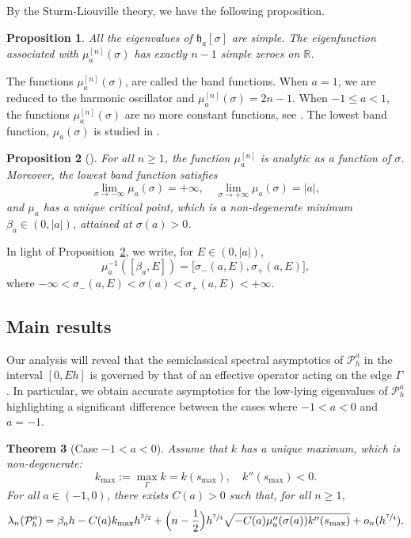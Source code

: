 \documentclass[10pt]{amsart}
\newcommand{\cP}{\mathcal{P}}
\theoremstyle{plain}
\newtheorem{theorem}{Theorem}[section]
\newtheorem{proposition}[theorem]{Proposition}
\theoremstyle{definition}
\newcommand{\R}{\mathbb{R}}
\begin{document}
By the Sturm-Liouville theory, we have the following proposition.

\begin{proposition}\label{lem.simple}
All the eigenvalues of $\mathfrak h_a[\sigma]$ are simple. 
The eigenfunction associated with $\mu^{[n]}_{a}(\sigma)$ has exactly $n-1$ simple zeroes on $\R$.
\end{proposition}

The functions $\mu^{[n]}_{a}(\sigma)$, are called the band functions. When $a=1$, we are reduced to the harmonic oscillator and $\mu^{[n]}_a(\sigma)=2n-1$. When $-1\leq a<1$, the functions $\mu^{[n]}_a(\sigma)$ are no more constant functions, see \cite{HPRS16}. The lowest band function, $\mu_{a}(\sigma)$ is studied in \cite{AK20}.

\begin{proposition}[\cite{AK20, HPRS16}]\label{prop.mu-a}
For all $n\geq 1$, the function $\mu^{[n]}_{a}$ is analytic as a function of $\sigma$. Moreover, the lowest band function satisfies
\begin{equation}\label{eq:limit-mu-a}
\lim\limits_{\sigma\to-\infty}\mu_a(\sigma)=+\infty,\quad \lim\limits_{\sigma\to+\infty}\mu_a(\sigma)=|a|,
\end{equation}
and $\mu_a$ has a unique critical point, which is a non-degenerate minimum $\beta_a\in(0,|a|)$, attained at $\sigma(a)>0$.
\end{proposition}
In light of Proposition~\ref{prop.mu-a}, we write, for $E\in(0,|a|)$,
\begin{equation}\label{eq:xi-pm}
\mu^{-1}_a([\beta_a,E])=\bigl[\sigma_-(a,E),\sigma_+(a,E)\bigr],
\end{equation}
where $-\infty<\sigma_-(a,E)<\sigma(a)<\sigma_+(a,E)<+\infty$.

\subsection{Main results}
Our analysis will reveal that the semiclassical spectral asymptotics of $\cP^a_h$ in the interval $[0,Eh]$ is governed by that of an effective operator acting on the edge $\Gamma$. In particular, we obtain accurate asymptotics for the low-lying eigenvalues of $\cP^a_h$ highlighting a significant difference between the cases where $-1<a<0$ and $a=-1$.

\begin{theorem}[Case $-1<a<0$]\label{corol.a>-1}
Assume that $k$ has a unique maximum, which is non-degenerate:
\[
k_{\max}:=\max_\Gamma k=k(s_{\max}),\quad k''(s_{\max})<0.
\]
For all $a\in(-1,0)$, there exists $C(a)>0$ such that, for all $n\geq 1$,
\[
\lambda_n(\cP^a_h)=
\beta_a h-C(a)k_{\max}h^{\sfrac32}+\Bigl(n-\frac 12\Bigr)h^{\sfrac74}\sqrt{-C(a)\mu''_a(\sigma(a))k''(s_{\max})}+o_n(h^{\sfrac74}).
\] 
\end{theorem}
\end{document}
